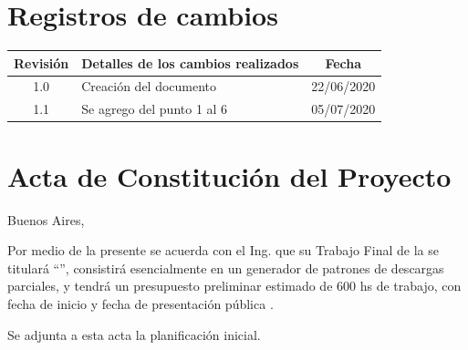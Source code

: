 \documentclass[11pt]{charter}
\begin{document}
\maketitle
\thispagestyle{empty}
\pagebreak


\thispagestyle{empty}
{\setlength{\parskip}{0pt}
\tableofcontents{}
}
\pagebreak


\section{Registros de cambios}
\label{sec:registro}


\begin{table}[ht]
\label{tab:registro}
\centering

\begin{tabularx}{\linewidth}{@{}|c|X|c|@{}}
\hline
\rowcolor[HTML]{C0C0C0} 
Revisión & \multicolumn{1}{c|}{\cellcolor[HTML]{C0C0C0}Detalles de los cambios realizados} & Fecha      \\ \hline
1.0      & 	Creación del documento     				& 22/06/2020 \\ \hline
1.1      & 	Se agrego del punto 1 al 6	 			& 05/07/2020 \\ \hline
\end{tabularx}
\end{table}

\pagebreak



\section{Acta de Constitución del Proyecto}
\label{sec:acta}

\begin{flushright}
Buenos Aires, \fechaInicioName
\end{flushright}

\vspace{2 cm}

Por medio de la presente se acuerda con el Ing. \authorname\hspace{1px} que su Trabajo Final de la \degreename\hspace{1px} se titulará ``\ttitle'', consistirá esencialmente en un generador de patrones de descargas parciales, y tendrá un presupuesto preliminar estimado de 600 hs de trabajo, con fecha de inicio \fechaInicioName\hspace{1px} y fecha de presentación pública \fechaFinalName.

Se adjunta a esta acta la planificación inicial.
\end{document}
